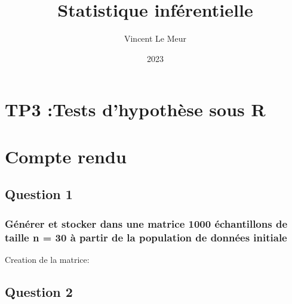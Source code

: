 \documentclass[
]{article}
\title{Statistique inférentielle}
\author{Vincent Le Meur}
\date{2023}
\newenvironment{Shaded}{\begin{snugshade}}{\end{snugshade}}
\newcommand{\AttributeTok}[1]{\textcolor[rgb]{0.77,0.63,0.00}{#1}}
\newcommand{\ConstantTok}[1]{\textcolor[rgb]{0.00,0.00,0.00}{#1}}
\newcommand{\DecValTok}[1]{\textcolor[rgb]{0.00,0.00,0.81}{#1}}
\newcommand{\FunctionTok}[1]{\textcolor[rgb]{0.00,0.00,0.00}{#1}}
\newcommand{\NormalTok}[1]{#1}
\newcommand{\OtherTok}[1]{\textcolor[rgb]{0.56,0.35,0.01}{#1}}
\newcommand{\SpecialCharTok}[1]{\textcolor[rgb]{0.00,0.00,0.00}{#1}}
\begin{document}
\maketitle

\hypertarget{tp3-tests-dhypothuxe8se-sous-r}{%
\section{TP3 :Tests d'hypothèse sous
R}\label{tp3-tests-dhypothuxe8se-sous-r}}

\hypertarget{compte-rendu}{%
\section{Compte rendu}\label{compte-rendu}}

\hypertarget{question-1}{%
\subsection{Question 1}\label{question-1}}

\hypertarget{guxe9nuxe9rer-et-stocker-dans-une-matrice-1000-uxe9chantillons-de-taille-n-30-uxe0-partir-de-la-population-de-donnuxe9es-initiale}{%
\subsubsection{Générer et stocker dans une matrice 1000 échantillons de
taille n = 30 à partir de la population de données
initiale}\label{guxe9nuxe9rer-et-stocker-dans-une-matrice-1000-uxe9chantillons-de-taille-n-30-uxe0-partir-de-la-population-de-donnuxe9es-initiale}}

Creation de la matrice:

\begin{Shaded}
\end{Shaded}

\hypertarget{question-2}{%
\subsection{Question 2}\label{question-2}}
\end{document}
